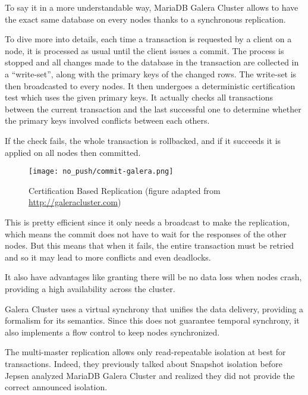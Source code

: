 To say it in a more understandable way, MariaDB Galera Cluster allows to have the exact same database on every nodes thanks to a synchronous replication.

To dive more into details, each time a transaction is requested by a client on a node, it is processed as usual until the client issues a commit. The process is stopped and all changes made to the database in the transaction are collected in a ``write-set'', along with the primary keys of the changed rows. The write-set is then broadcasted to every nodes. It then undergoes a deterministic certification test which uses the given primary keys. It actually checks all transactions between the current transaction and the last successful one to determine whether the primary keys involved conflicts between each others.

If the check fails, the whole transaction is rollbacked, and if it succeeds it is applied on all nodes then committed.

\begin{figure}[H]
  \vspace{-10pt}
  \centering
  \centerline{\texttt{[image: no\_push/commit-galera.png]}}
  \vspace{-5pt}
  \caption{Certification Based Replication (figure adapted from \url{http://galeracluster.com}) }
  \vspace{-5pt}
  \label{fig:certificationcommit}
\end{figure}


This is pretty efficient since it only needs a broadcast to make the replication, which means the commit does not have to wait for the responses of the other nodes. But this means that when it fails, the entire transaction must be retried and so it may lead to more conflicts and even deadlocks.

It also have advantages like granting there will be no data loss when nodes crash, providing a high availability across the cluster.

Galera Cluster uses a virtual synchrony that unifies the data delivery, providing a formalism for its semantics. Since this does not guarantee temporal synchrony, it also implements a flow control to keep nodes synchronized.

The multi-master replication allows only read-repeatable isolation at best for transactions. Indeed, they previously talked about Snapshot isolation before Jepsen analyzed MariaDB Galera Cluster and realized they did not provide the correct announced isolation\cite{MGC:jepsen}.



